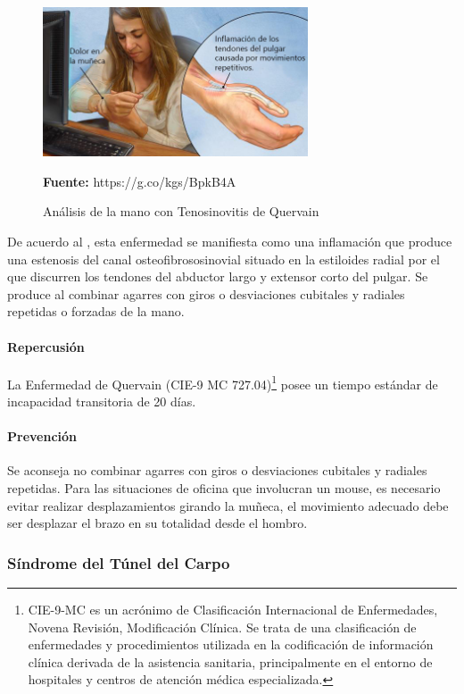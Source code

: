 \begin{figure}[H]
    \centering
    \includegraphics[width=0.7\textwidth]{Anexos/LATEX/chapters/images/TDQ.jpg}
    \caption{Análisis de la mano con Tenosinovitis de Quervain}
    \small{\textbf{Fuente:} https://g.co/kgs/BpkB4A}
    \label{TDQ}
\end{figure}

De acuerdo al \parencite[2]{INSHT2017TendinitisPulgar}, esta enfermedad se manifiesta como una inflamación que produce una estenosis del canal osteofibrososinovial situado en la estiloides radial por el que discurren los tendones del abductor largo y extensor corto del pulgar. Se produce al combinar agarres con giros o desviaciones cubitales y radiales repetidas o forzadas de la mano.
\paragraph{Repercusión}
La Enfermedad de Quervain (CIE-9 MC 727.04)\footnote{CIE-9-MC es un acrónimo de Clasificación Internacional de Enfermedades, Novena Revisión, Modificación Clínica. Se trata de una clasificación de enfermedades y procedimientos utilizada en la codificación de información clínica derivada de la asistencia sanitaria, principalmente en el entorno de hospitales y centros de atención médica especializada.} posee un tiempo estándar de incapacidad transitoria de 20 días.\parencite[6]{INSHT2017TendinitisPulgar}
\paragraph{Prevención}
Se aconseja no combinar agarres con giros o desviaciones cubitales y radiales repetidas. Para las situaciones de oficina que involucran un mouse, es necesario evitar realizar desplazamientos girando la muñeca, el movimiento adecuado debe ser desplazar el brazo en su totalidad desde el hombro. \parencite[5]{INSHT2017TendinitisPulgar}
\subsubsection{Síndrome del Túnel del Carpo}
